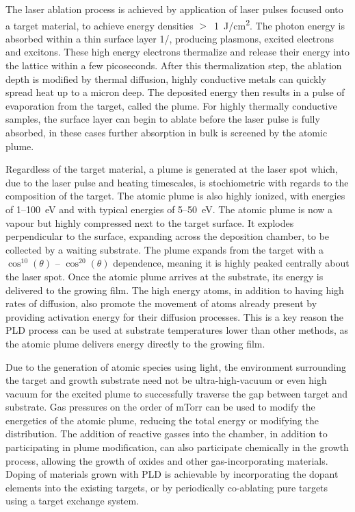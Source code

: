 The laser ablation process is achieved by application of laser pulses focused onto a target material, to achieve energy densities \(>\)~1~J/cm\textsuperscript{2}.
The photon energy is absorbed within a thin surface layer 1/\textalpha{}, producing plasmons, excited electrons and excitons\cite{Willmott2000}.
These high energy electrons thermalize and release their energy into the lattice within a few picoseconds.
After this thermalization step, the ablation depth is modified by thermal diffusion, highly conductive metals can quickly spread heat up to a micron deep.
The deposited energy then results in a pulse of evaporation from the target, called the plume.
For highly thermally conductive samples, the surface layer can begin to ablate before the laser pulse is fully absorbed, in these cases further absorption in bulk is screened by the atomic plume\cite{Willmott2000}.

Regardless of the target material, a plume is generated at the laser spot which, due to the laser pulse and heating timescales, is stochiometric with regards to the composition of the target.
The atomic plume is also highly ionized, with energies of 1--100~eV and with typical energies of 5--50~eV\@. The atomic plume is now a vapour but highly compressed next to the target surface.
It explodes perpendicular to the surface, expanding across the deposition chamber, to be collected by a waiting substrate.
The plume expands from the target with a \(\cos^{10}(\theta)\) -- \(\cos^{20}(\theta)\)
dependence, meaning it is highly peaked centrally about the laser spot.
Once the atomic plume arrives at the substrate, its energy is delivered to the growing film.
The high energy atoms, in addition to having high rates of diffusion, also promote the movement of atoms already present by providing activation energy for their diffusion processes\cite{Willmott2000}.
This is a key reason the PLD process can be used at substrate temperatures lower than other methods, as the atomic plume delivers energy directly to the growing film.

Due to the generation of atomic species using light, the environment surrounding the target and growth substrate need not be ultra-high-vacuum or even high vacuum for the excited plume to successfully traverse the gap between target and substrate.
Gas pressures on the order of mTorr can be used to modify the energetics of the atomic plume, reducing the total energy or modifying the distribution\cite{Willmott2000}.
The addition of reactive gasses into the chamber, in addition to participating in plume modification, can also participate chemically in the growth process, allowing the growth of oxides and other gas-incorporating materials.
Doping of materials grown with PLD is achievable by incorporating the dopant elements into the existing targets, or by periodically co-ablating pure targets using a target exchange system.

